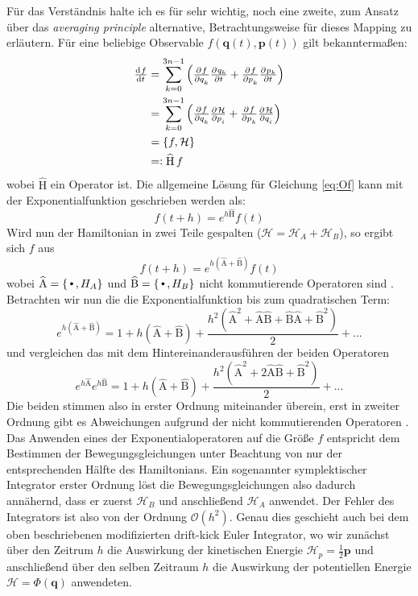 \documentclass[12pt,a4paper,twoside,open=right,bibliography=totoc]{scrbook}
\renewcommand{\cite}{ \citep}
\newcommand*{\Cdot}{\raisebox{-0.75ex}{\scalebox{2.5}{$\cdot$}}}
\renewcommand{\vec}{\mathbf}
\renewcommand{\H}{\mathcal H}
\newcommand{\OH}{\operatorname{\widehat{H}}}
\newcommand{\OA}{\operatorname{\widehat{A}}} %
\newcommand{\OB}{\operatorname{\widehat{B}}}
\begin{document}
Für das Verständnis halte ich es für sehr wichtig, noch eine zweite, zum Ansatz über das \emph{averaging principle} alternative, Betrachtungsweise für dieses Mapping zu erläutern.
Für eine beliebige Observable $f(\vec q(t),\vec p(t))$ gilt bekanntermaßen:
\begin{equation}
\begin{split}
\od{f}{t} &= 
\sum_{k=0}^{3n-1} \left(
	\pd{f}{q_k} \pd{q_k}{t} +
	\pd{f}{p_k} \pd{p_k}{t}
\right) \\ &=
\sum_{k=0}^{3n-1} \left(
	\pd{f}{q_k} \pd{\H}{p_i} +
	\pd{f}{p_k} \pd{\H}{q_i}
\right) \\ &=
\lbrace f,\H \rbrace \\ &=:
\OH f \label{eq:Of}
\end{split}
\end{equation}
wobei $\OH$ ein Operator ist. Die allgemeine Lösung für Gleichung \ref{eq:Of} kann mit der Exponentialfunktion geschrieben werden als:
\begin{equation}
f(t+h) = e^{h\OH}f(t)
\end{equation}
Wird nun der Hamiltonian in zwei Teile gespalten ($\H=\H_A+\H_B$), so ergibt sich $f$ aus
\begin{equation}
f(t+h)=e^{h\left(\OA+\OB\right)}f(t)
\end{equation}
wobei $\OA=\lbrace \Cdot, H_A \rbrace$ und $\OB=\lbrace \Cdot, H_B \rbrace$ nicht kommutierende Operatoren sind\cite{Chambers1999}. Betrachten wir nun die die Exponentialfunktion bis zum quadratischen Term:
\begin{equation}
e^{h\left(\OA+\OB\right)} = 1 + h\left(\OA+\OB\right) + \frac{h^2\left(\OA^2+\OA\OB+\OB\OA+\OB^2\right)}{2} + ... \label{eq:OAB}
\end{equation}
und vergleichen das mit dem Hintereinanderausführen der beiden Operatoren
\begin{equation}
e^{h\OA}e^{h\OB} = 1 + h\left(\OA+\OB\right) + \frac{h^2\left(\OA^2+2\OA\OB+\OB^2\right)}{2} + ... \label{eq:OA+B}
\end{equation}
Die beiden stimmen also in erster Ordnung miteinander überein, erst in zweiter Ordnung gibt es Abweichungen aufgrund der nicht kommutierenden Operatoren\cite{Chambers1999}. Das Anwenden eines der Exponentialoperatoren auf die Größe $f$ entspricht dem Bestimmen der Bewegungsgleichungen unter Beachtung von nur der entsprechenden Hälfte des Hamiltonians.
Ein sogenannter symplektischer Integrator erster Ordnung löst die Bewegungsgleichungen also dadurch annähernd, dass er zuerst $\H_B$ und anschließend $\H_A$ anwendet.
Der Fehler des Integrators ist also von der Ordnung $\mathcal{O}(h^2)$.
Genau dies geschieht auch bei dem oben beschriebenen modifizierten drift-kick Euler Integrator,
wo wir zunächst über den Zeitrum $h$ die Auswirkung der kinetischen Energie $\H_p=\frac{1}{2}\vec{p}$ und anschließend über den selben Zeitraum $h$ die Auswirkung der potentiellen Energie $\H=\Phi(\vec{q})$ anwendeten.
\end{document}
